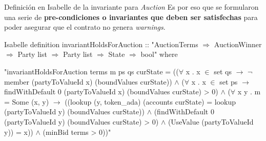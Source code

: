 \documentclass{beamer}
\newcommand{\nologo}{\setbeamertemplate{logo}{}} %
\begin{document}





{\nologo
\begin{frame}[fragile]{Definición en Isabelle de la invariante para \textit{Auction}}
Es por eso que se formularon una serie de \textbf{pre-condiciones o invariantes que deben ser satisfechas} para poder asegurar que el contrato no genera \textit{warnings}.

\vfill

\begin{code}{Isabelle}
definition invariantHoldsForAuction :: "AuctionTerms $\Rightarrow$ AuctionWinner $\Rightarrow$ Party list $\Rightarrow$ Party list $\Rightarrow$ State $\Rightarrow$ bool" where

"invariantHoldsForAuction terms m ps qs curState =
       (($\forall$ x . x $\in$ set qs $\longrightarrow$
                $\neg$ member (partyToValueId x) (boundValues curState))
     $\land$ ($\forall$ x . x $\in$ set ps $\longrightarrow$ 
                findWithDefault 0 (partyToValueId x) (boundValues curState) > 0)
     $\land$ ($\forall$ x y . m = Some (x, y) $\longrightarrow$ 
              ((lookup (y, token_ada) (accounts curState) = 
                lookup (partyToValueId y) (boundValues curState))
             $\land$ (findWithDefault 0 (partyToValueId y) (boundValues curState) > 0) 
             $\land$ (UseValue (partyToValueId y)) = x))
     $\land$ (minBid terms > 0))"
\end{code}

\end{frame}
}
\end{document}
